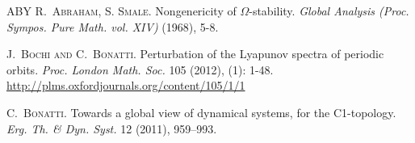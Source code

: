 \documentclass[11pt, a4paper]{amsart}
\theoremstyle{plain}
\theoremstyle{definition}
\theoremstyle{remark}
\numberwithin{equation}{section}         %
\newcommand{\SL}{\mathrm{SL}}
\begin{document}
\begin{thebibliography}{ABY}
\textsc{R.~Abraham, S. Smale.}
Nongenericity of $\Omega$-stability.
{\it Global Analysis (Proc. Sympos. Pure Math. vol. XIV)} (1968), 5-8.


%


\textsc{J.~Bochi and C.~Bonatti.}
Perturbation of the Lyapunov spectra of periodic orbits.
{\it Proc. London Math. Soc.}  105 (2012), (1): 1-48.
\newblock \url{http://plms.oxfordjournals.org/content/105/1/1}

\textsc{C.~Bonatti.} Towards a global view of dynamical systems, for the C1-topology.
\textit{Erg. Th. \& Dyn. Syst.} 12 (2011), 959--993.



%
%
%


%

%

%

%
%
%
%



\end{thebibliography}
\end{document}
